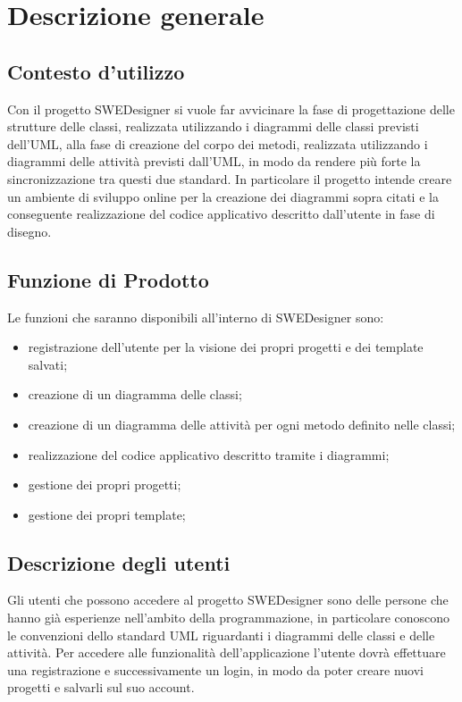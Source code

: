 \section{Descrizione generale}
\subsection{Contesto d'utilizzo}
Con il progetto SWEDesigner si vuole far avvicinare la fase di progettazione delle strutture delle classi, realizzata utilizzando i diagrammi delle classi previsti dell'UML, alla fase di creazione del corpo dei metodi, realizzata utilizzando i diagrammi delle attività previsti dall'UML, in modo da  rendere più forte la sincronizzazione tra questi due standard. In particolare il progetto intende creare un ambiente di sviluppo online per la creazione dei diagrammi sopra citati e la conseguente realizzazione del codice applicativo descritto dall'utente in fase di disegno.
 
\subsection{Funzione di Prodotto}
Le funzioni che saranno disponibili all'interno di SWEDesigner sono:
\begin{itemize}
\item registrazione dell'utente per la visione dei propri progetti e dei template salvati; \\
\item creazione di un diagramma delle classi; \\
\item creazione di un diagramma delle attività per ogni metodo definito nelle classi;
\item realizzazione del codice applicativo descritto tramite i diagrammi;
\item gestione dei propri progetti;
\item gestione dei propri template;
\end{itemize}

\subsection{Descrizione degli utenti}
Gli utenti che possono accedere al progetto SWEDesigner sono delle persone che hanno già esperienze nell'ambito della programmazione, in particolare conoscono le convenzioni dello standard UML riguardanti i diagrammi delle classi e delle attività. 
Per accedere alle funzionalità dell'applicazione l'utente dovrà effettuare una registrazione e successivamente un login, in modo da poter creare nuovi progetti e salvarli sul suo account.